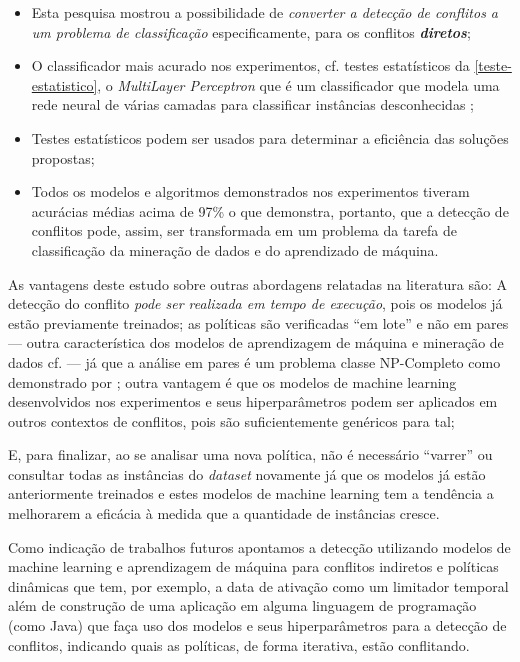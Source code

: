 \begin{itemize}
	\item Esta pesquisa mostrou a possibilidade de \textit{converter a detecção de conflitos a um problema de classificação} especificamente, para os conflitos \textbf{\textit{diretos}};
	\item O classificador mais acurado nos experimentos, cf. testes estatísticos da \autoref{teste-estatistico}, o \textit{MultiLayer Perceptron} que é um classificador que modela uma rede neural de várias camadas para classificar instâncias desconhecidas \cite{eibe2016};
	\item Testes estatísticos podem ser usados para determinar a eficiência das soluções propostas;
	\item Todos os modelos e algoritmos demonstrados nos experimentos tiveram acurácias médias acima de 97\% o que demonstra, portanto, que a detecção de conflitos pode, assim, ser transformada em um problema da tarefa de classificação da mineração de dados e do aprendizado de máquina.
\end{itemize}

As vantagens deste estudo sobre outras abordagens relatadas na literatura são: A detecção do conflito \textit{pode ser realizada em tempo de execução}, pois os modelos já estão previamente treinados; as políticas são verificadas ``em lote'' e não em pares --- outra característica dos modelos de aprendizagem de máquina e mineração de dados cf.  --- já que a análise em pares é um problema classe NP-Completo como demonstrado por ; outra vantagem é que os modelos de machine learning desenvolvidos nos experimentos e seus hiperparâmetros podem ser aplicados em outros contextos de conflitos, pois são suficientemente genéricos para tal;

E, para finalizar, ao se analisar uma nova política, não é necessário ``varrer'' ou consultar todas as instâncias do \textit{dataset} novamente já que os modelos já estão anteriormente treinados e estes modelos de machine learning tem a tendência a melhorarem a eficácia à medida que a quantidade de instâncias cresce.

Como indicação de trabalhos futuros apontamos a detecção utilizando modelos de machine learning e aprendizagem de máquina para conflitos indiretos e políticas dinâmicas que tem, por exemplo, a data de ativação como um limitador temporal além de construção de uma aplicação em alguma linguagem de programação (como Java) que faça uso dos modelos e seus hiperparâmetros para a detecção de conflitos, indicando quais as políticas, de forma iterativa, estão conflitando.
